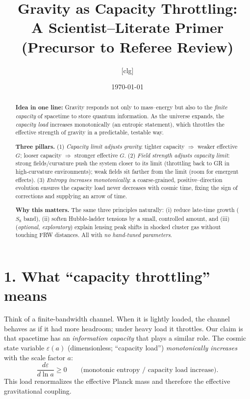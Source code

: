 \documentclass[aps,prd,onecolumn,superscriptaddress,nofootinbib]{revtex4-2}
\newcommand{\eps}{\varepsilon}
\begin{document}
\title{Gravity as Capacity Throttling:\\
A Scientist–Literate Primer (Precursor to Referee Review)}

\author{[clg]}
\affiliation{[Institution(s)]}
\date{\today}

\begin{abstract}
\textbf{Idea in one line:} Gravity responds not only to mass–energy but also to the \emph{finite capacity} of spacetime to store quantum information. As the universe expands, the \emph{capacity load} increases monotonically (an entropic statement), which throttles the effective strength of gravity in a predictable, testable way.

\smallskip
\textbf{Three pillars.}
(1) \emph{Capacity limit adjusts gravity}: tighter capacity $\Rightarrow$ weaker effective $G$; looser capacity $\Rightarrow$ stronger effective $G$.
(2) \emph{Field strength adjusts capacity limit}: strong fields/curvature push the system closer to its limit (throttling back to GR in high-curvature environments); weak fields sit farther from the limit (room for emergent effects).
(3) \emph{Entropy increases monotonically}: a coarse-grained, positive–direction evolution ensures the capacity load never decreases with cosmic time, fixing the sign of corrections and supplying an arrow of time.

\smallskip
\textbf{Why this matters.} The same three principles naturally: (i) reduce late-time growth ($S_8$ band), (ii) soften Hubble-ladder tensions by a small, controlled amount, and (iii) (\emph{optional, exploratory}) explain lensing peak shifts in shocked cluster gas without touching FRW distances. All with \emph{no hand-tuned parameters}.
\end{abstract}

\maketitle

\section*{1. What ``capacity throttling'' means}
Think of a finite-bandwidth channel. When it is lightly loaded, the channel behaves as if it had more headroom; under heavy load it throttles. Our claim is that spacetime has an \emph{information capacity} that plays a similar role. The cosmic state variable $\eps(a)$ (dimensionless; ``capacity load'') \emph{monotonically increases} with the scale factor $a$:
\[
\frac{d\eps}{d\ln a} \ge 0 \qquad \text{(monotonic entropy / capacity load increase).}
\]
This load renormalizes the effective Planck mass and therefore the effective gravitational coupling.
\end{document}

